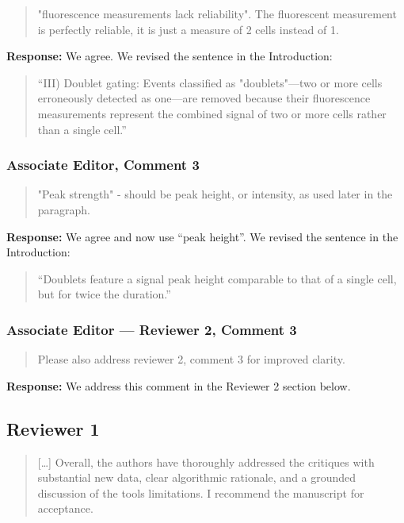 \documentclass[
  11pt,
  a4paper,
]{article}
\begin{document}
\begin{quote}
"fluorescence measurements lack reliability". The fluorescent
measurement is perfectly reliable, it is just a measure of 2 cells
instead of 1.
\end{quote}

\textbf{Response:} We agree. We revised the sentence in the
Introduction:

\begin{quote}
``III) Doublet gating: Events classified as "doublets"---two or more
cells erroneously detected as one---are removed because their
fluorescence measurements represent the combined signal of two or more
cells rather than a single cell.''
\end{quote}

\subsubsection{Associate Editor, Comment
3}\label{associate-editor-comment-3}

\begin{quote}
"Peak strength" - should be peak height, or intensity, as used later in
the paragraph.
\end{quote}

\textbf{Response:} We agree and now use ``peak height''. We revised the
sentence in the Introduction:

\begin{quote}
``Doublets feature a signal peak height comparable to that of a single
cell, but for twice the duration.''
\end{quote}

\subsubsection{Associate Editor --- Reviewer 2, Comment
3}\label{associate-editor--reviewer-2-comment-3}

\begin{quote}
Please also address reviewer 2, comment 3 for improved clarity.
\end{quote}

\textbf{Response:} We address this comment in the Reviewer 2 section
below.

\subsection{Reviewer 1}\label{reviewer-1}

\begin{quote}
{[}\ldots{]} Overall, the authors have thoroughly addressed the
critiques with substantial new data, clear algorithmic rationale, and a
grounded discussion of the tool\textquotesingle s limitations. I
recommend the manuscript for acceptance.
\end{quote}
\end{document}
